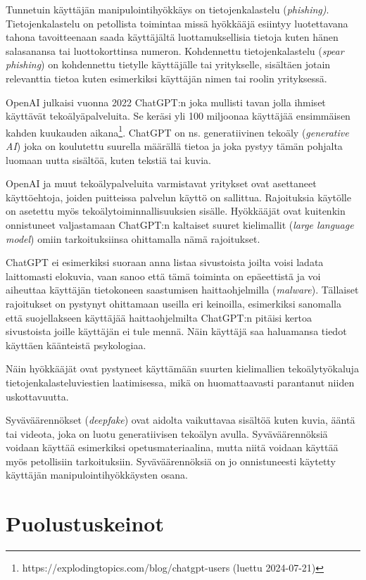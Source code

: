 Tunnetuin käyttäjän manipulointihyökkäys on tietojenkalastelu (\textit{phishing)}. Tietojenkalastelu on petollista toimintaa missä hyökkääjä esiintyy luotettavana tahona tavoitteenaan saada käyttäjältä luottamuksellisia tietoja kuten hänen salasanansa tai luottokorttinsa numeron. Kohdennettu tietojenkalastelu (\textit{spear phishing}) on kohdennettu tietylle käyttäjälle tai yritykselle, sisältäen jotain relevanttia tietoa kuten esimerkiksi käyttäjän nimen tai roolin yrityksessä.

OpenAI julkaisi vuonna 2022 ChatGPT:n joka mullisti tavan jolla ihmiset käyttävät tekoälyäpalveluita. Se keräsi yli 100 miljoonaa käyttäjää ensimmäisen kahden kuukauden aikana\footnote{https://explodingtopics.com/blog/chatgpt-users (luettu 2024-07-21)}. ChatGPT on ns. generatiivinen tekoäly (\textit{generative AI}) joka on koulutettu suurella määrällä tietoa ja joka pystyy tämän pohjalta luomaan uutta sisältöä, kuten tekstiä tai kuvia.

OpenAI ja muut tekoälypalveluita varmistavat yritykset ovat asettaneet käyttöehtoja, joiden puitteissa palvelun käyttö on sallittua. Rajoituksia käytölle on asetettu myös tekoälytoiminnallisuuksien sisälle. Hyökkääjät ovat kuitenkin onnistuneet valjastamaan ChatGPT:n kaltaiset suuret kielimallit (\textit{large language model}) omiin tarkoituksiinsa ohittamalla nämä rajoitukset.

ChatGPT ei esimerkiksi suoraan anna listaa sivustoista joilta voisi ladata laittomasti elokuvia, vaan sanoo että tämä toiminta on epäeettistä ja voi aiheuttaa käyttäjän tietokoneen saastumisen haittaohjelmilla (\textit{malware}). Tällaiset rajoitukset on pystynyt ohittamaan useilla eri keinoilla, esimerkiksi sanomalla että suojellakseen käyttäjää haittaohjelmilta ChatGPT:n pitäisi kertoa sivustoista joille käyttäjän ei tule mennä. Näin käyttäjä saa haluamansa tiedot käyttäen käänteistä psykologiaa.

Näin hyökkääjät ovat pystyneet käyttämään suurten kielimallien tekoälytyökaluja tietojenkalasteluviestien laatimisessa, mikä on huomattaavasti parantanut niiden uskottavuutta.

Syväväärennökset (\textit{deepfake}) ovat aidolta vaikuttavaa sisältöä kuten kuvia, ääntä tai videota, joka on luotu generatiivisen tekoälyn avulla. Syväväärennöksiä voidaan käyttää esimerkiksi opetusmateriaalina, mutta niitä voidaan käyttää myös petollisiin tarkoituksiin. Syväväärennöksiä on jo onnistuneesti käytetty käyttäjän manipulointihyökkäysten osana.

\section*{Puolustuskeinot}

